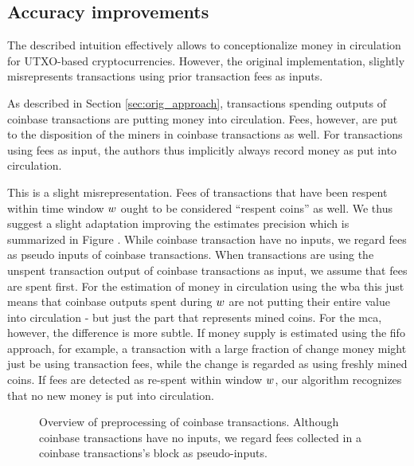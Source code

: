\subsection{Accuracy improvements}
\label{sec:inaccuracy_fees}%
The described intuition effectively allows to conceptionalize money in circulation for UTXO-based cryptocurrencies. %
However, the original implementation, slightly misrepresents transactions using prior transaction fees as inputs. %

As described in Section \ref{sec:orig_approach}, transactions spending outputs of coinbase transactions are putting money into circulation. %
Fees, however, are put to the disposition of the miners in coinbase transactions as well. %
For transactions using fees as input, the authors thus implicitly always record money as put into circulation. %

% 
% 
%

This is a slight misrepresentation. %
Fees of transactions that have been respent within time window \({w}\) ought to be considered ``respent coins'' as well. %
We thus suggest a slight adaptation improving the estimates precision which is summarized in Figure . %
While coinbase transaction have no inputs, we regard fees as pseudo inputs of coinbase transactions. %
When transactions are using the unspent transaction output of coinbase transactions as input, we assume that fees are spent first. %
For the estimation of money in circulation using the \ac{wba} this just means that coinbase outputs spent during \({w}\) are not putting their entire value into circulation - but just the part that represents mined coins. %
For the \ac{mca}, however, the difference is more subtle. %
If money supply is estimated using the \ac{fifo} approach, for example, a transaction with a large fraction of change money might just be using transaction fees, while the change is regarded as using freshly mined coins. %
If fees are detected as re-spent within window \({w}\), our algorithm recognizes that no new money is put into circulation. %

\begin{figure}[t]
  \label{fig:improve_fees}%
	
	\centering
	\caption{Overview of preprocessing of coinbase transactions. Although coinbase transactions have no inputs, we regard fees collected in a coinbase transactions's block as pseudo-inputs.}
\end{figure}


